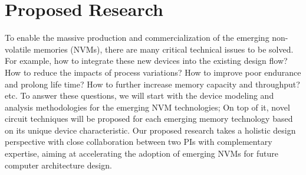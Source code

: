 \section{Proposed Research}
To enable the massive production and commercialization of the emerging non-volatile memories (NVMs), there are many critical technical issues to be solved. For example, how to integrate these new devices into the existing design flow? How to reduce the impacts of process variations? How to improve poor endurance and prolong life time? How to further increase memory capacity and throughput? etc. To answer these questions, we will start with the device modeling and analysis methodologies for the emerging NVM technologies; On top of it, novel circuit techniques will be proposed for each emerging memory technology based on its unique device characteristic. Our proposed research takes a holistic design perspective with close collaboration between two PIs with complementary expertise, aiming at accelerating the adoption of emerging NVMs for future computer architecture design.



%

